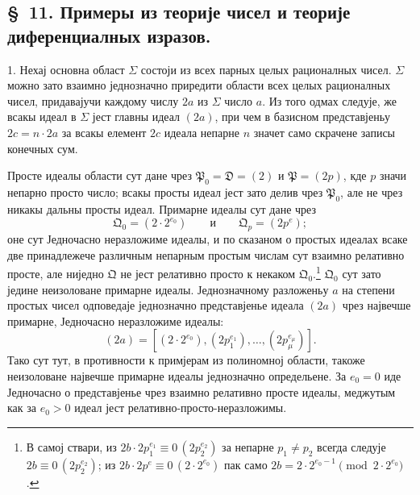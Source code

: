 ﻿\documentclass[11pt]{article}
\newcommand{\ideal}[1]{\mathfrak{#1}}
\newcommand{\eqzero}[1]{\equiv 0\,(#1)}
\begin{document}

\setcounter{footnote}{45}
\subsection*{\S~11. Примеры из теорије чисел и теорије диференциалных изразов.}

1. Нехај основна област \(\Sigma\) состоји из всех парных целых рационалных чисел. \(\Sigma\) можно зато взаимно једнозначно приредити области всех целых рационалных чисел, придавајучи каждому числу \(2a\) из \(\Sigma\) число \(a\). Из того одмах следује, же всакы идеал в \(\Sigma\) јест главны идеал \((2a)\), при чем в базисном представјеньу \(2c=n\cdot2a\) за всакы елемент \(2c\) идеала непарне \(n\) значет само скрачене записы конечных сум.

Просте идеалы области сут дане чрез \(\ideal P_0=\ideal D=(2)\) и \(\ideal P=(2p)\), кде \(p\) значи непарно просто число; всакы просты идеал јест зато делив чрез \(\ideal P_0\), але не чрез никакы дальны просты идеал. Примарне идеалы сут дане чрез
\[
 \ideal Q_0=(2\cdot2^{e_0})
 \qquad\text{и}\qquad
 \ideal Q_p=(2p^e);
\]
оне сут Једночасно неразложиме идеалы, и по сказаном о простых идеалах всаке две принадлежече различным непарным простым числам сут взаимно релативно просте, але ниједно \(\ideal Q\) не јест релативно просто к некаком \(\ideal Q_0\).\footnote{В самој ствари, из \(2b\cdot2p_1^{e_1}\eqzero{2p_2^{e_2}}\) за непарне \(p_1\ne p_2\) всегда следује \(2b\eqzero{2p_2^{e_2}}\); из \(2b\cdot2p^e\eqzero{2\cdot2^{e_0}}\) пак само \(2b=2\cdot2^{e_0-1}\pmod{2\cdot2^{e_0}}\).} \(\ideal Q_0\) сут зато једине неизоловане примарне идеалы. Једнозначному разложеньу \(a\) на степени простых чисел одповедаје једнозначно представјенье идеала \((2a)\) чрез највечше примарне, Једночасно неразложиме идеалы:
\[
 (2a)=[(2\cdot2^{e_0}),(2p_1^{e_1}),
\ldots,(2p_\mu^{e_\mu})].
\]
Тако сут тут, в противности к примјерам из полиномној области, такоже неизоловане највечше примарне идеалы једнозначно определьене. За \(e_0=0\) иде Једночасно о представјенье чрез взаимно релативно просте идеалы, меджутым как за \(e_0>0\) идеал јест релативно-просто-неразложимы.
\end{document}

